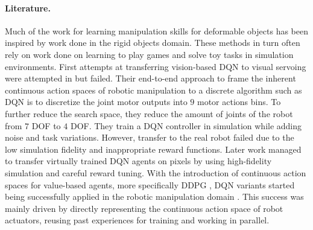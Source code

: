 \documentclass[\home/main.tex]{subfiles}
\begin{document}
\paragraph{Literature.}
Much of the work for learning manipulation skills for deformable objects has been inspired by work done in the rigid objects domain. These methods in turn often rely on work done on learning to play games and solve toy tasks in simulation environments.  First attempts at transferring vision-based DQN to visual servoing were attempted in \autocite{Zhang2015} but failed. Their end-to-end approach to frame the inherent continuous action spaces of robotic manipulation to a discrete algorithm such as DQN is to discretize the joint motor outputs into $9$ motor actions bins. To further reduce the search space, they reduce the amount of joints of the robot from $7$ DOF to $4$ DOF. They train a DQN controller in simulation while adding noise and task variations. However, transfer to the real robot failed due to the low simulation fidelity and inappropriate reward functions. Later work \autocite{James2016} managed to transfer virtually trained DQN agents on pixels by using high-fidelity simulation and careful reward tuning. With the introduction of continuous action spaces for value-based agents, more specifically DDPG \autocite{Lillicrap2015}, DQN variants started being successfully applied in the robotic manipulation domain \autocite{Gu2017}. This success was mainly driven by directly representing the continuous action space of robot actuators, reusing past experiences for training and working in parallel.
\end{document}

